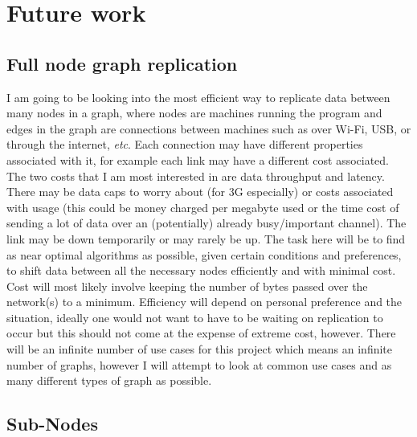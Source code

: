 \documentclass[12pt]{article}
\begin{document}

\section{Future work}
\subsection{Full node graph replication}
I am going to be looking into the most efficient way to
replicate data between many nodes in a graph, where nodes are machines
running the program and edges in the graph are connections
between machines such as over Wi-Fi, USB, or through the internet, \emph{etc}.
Each connection may have different properties associated
with it, for example each link may have a different cost
associated. The two costs that I am most interested in
are data throughput and latency. There may be data caps to worry about
(for 3G especially) or costs associated with usage
(this could be money charged per megabyte used or
the time cost of sending a lot of data over an (potentially)
already busy/important channel). The link may be down
temporarily or may rarely be up. The task here will be
to find as near optimal algorithms as possible,
given certain conditions and preferences,
to shift data between all the necessary nodes
efficiently and with minimal cost. 
Cost will most likely involve keeping the number
of bytes passed over the network(s) to a minimum.
Efficiency will depend on personal preference and
the situation, ideally one would not want to have
to be waiting on replication to occur but this
should not come at the expense of extreme cost, however.
There will be an infinite number of use cases for this
project which means an infinite number of graphs,
however I will attempt to look at common use cases
and as many different types of graph as possible.

\subsection{Sub-Nodes}
\end{document}
